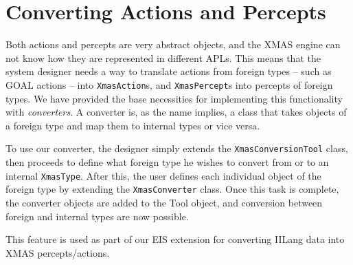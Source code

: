 
\section{Converting Actions and Percepts}

Both actions and percepts are very abstract objects, and the XMAS
engine can not know how they are represented in different APLs. This
means that the system designer needs a way to translate actions from
foreign types -- such as GOAL actions -- into \texttt{XmasAction}s,
and \texttt{XmasPercept}s into percepts of foreign types. We have
provided the base necessities for implementing this functionality
with \emph{converters}. A converter is, as the name implies, a class
that takes objects of a foreign type and map them to internal types
or vice versa. 

To use our converter, the designer simply extends the \texttt{XmasConversionTool}
class, then proceeds to define what foreign type he wishes to convert
from or to an internal \texttt{XmasType}. After this, the user defines
each individual object of the foreign type by extending the \texttt{XmasConverter}
class. Once this task is complete, the converter objects are added
to the Tool object, and conversion between foreign and internal types
are now possible. 

This feature is used as part of our EIS extension for converting IILang
data into XMAS percepts/actions.
